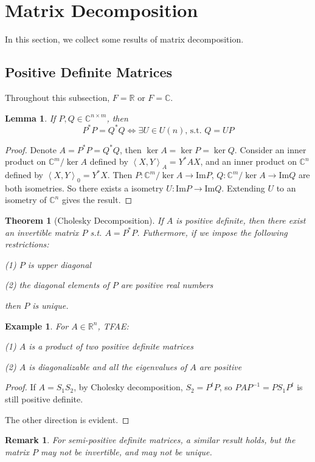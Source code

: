 \documentclass{book}
\newtheorem{theorem}{Theorem}[section]
\newtheorem{lemma}{Lemma}[section]
\newtheorem{example}{Example}[section]
\newtheorem*{remark}{Remark}
\theoremstyle{definition}
\begin{document}
\section{Matrix Decomposition}
In this section, we collect some results of matrix decomposition. 

\subsection{Positive Definite Matrices}
Throughout this subsection, $F=\mathbb{R}$ or $F=\mathbb{C}$.
\begin{lemma}
    If $P,Q\in \mathbb{C}^{n\times m}$, then 
    \[P^*P=Q^*Q\Longleftrightarrow \exists U\in U(n)\text{, s.t. }Q=UP\]
\end{lemma}
\begin{proof}
    Denote $A=P^*P=Q^*Q$, then $\ker A=\ker P=\ker Q$. Consider an inner product on $\mathbb{C}^m/\ker A$ defined by $\left\langle X,Y\right\rangle _A=Y^*AX$, and
an inner product on $\mathbb{C}^n$ defined by $\left\langle X,Y\right\rangle _0=Y^*X$. Then $P:\mathbb{C}^m/\ker A\to \text{Im}P$, $Q:\mathbb{C}^m/\ker A\to\text{Im}Q$ are both isometries.
So there exists a isometry $U:\text{Im}P\to\text{Im}Q$. Extending $U$ to an isometry of $\mathbb{C}^n$ gives the result.
\end{proof}
\begin{theorem}[Cholesky Decomposition]
    If $A$ is positive definite, then there exist an invertible matrix $P$ s.t. $A=P^*P$. Futhermore, if we impose the following restrictions:\par
    (1) $P$ is upper diagonal\par
    (2) the diagonal elements of $P$ are positive real numbers\par
    then $P$ is unique.
\end{theorem}
\begin{example}
    For $A\in\mathbb{R}^n$, TFAE:\par
    (1) $A$ is a product of two positive definite matrices\par
    (2) $A$ is diagonalizable and all the eigenvalues of $A$ are positive

\end{example}
\begin{proof}
    If $A=S_1S_2$, by Cholesky decomposition, $S_2=P^tP$, so $PAP^{-1}=PS_1P^t$ is still positive definite.\par
    The other direction is evident.
\end{proof}
\begin{remark}
    For semi-positive definite matrices, a similar result holds, but the matrix $P$ may not be invertible, and may not be unique.
\end{remark}
\end{document}
